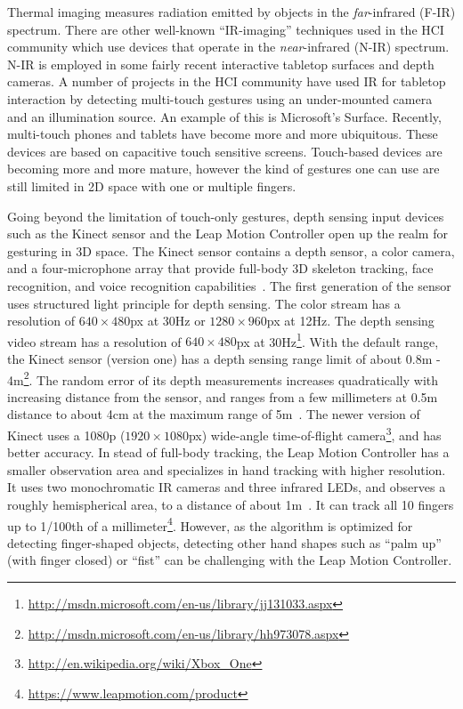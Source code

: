 Thermal imaging measures radiation emitted by objects in the
\textit{far}-infrared (F-IR) spectrum. There are other well-known ``IR-imaging''
techniques used in the HCI community which use devices that operate in the \textit{near}-infrared (N-IR) spectrum.
N-IR is employed in some fairly recent interactive tabletop surfaces and depth
cameras. A number of projects in the HCI community have used IR for tabletop
interaction by detecting multi-touch gestures using an under-mounted
camera and an illumination source. An example of this is Microsoft's 
Surface. Recently, multi-touch phones and tablets have become more and more ubiquitous. These devices
are based on capacitive touch sensitive screens. Touch-based devices are
becoming more and more mature, however the kind of gestures one can use are still
limited in 2D space with one or multiple
fingers. 

Going beyond the limitation of touch-only gestures, 
depth sensing input devices such as the Kinect sensor and the Leap Motion
Controller open up the realm for gesturing in 3D space. The Kinect sensor
contains a depth sensor, a color camera, and a four-microphone array that
provide full-body 3D skeleton tracking, face recognition, and voice
recognition capabilities~\cite{zhang12}. The first generation of the sensor
uses structured light principle for depth sensing.
The color stream has a resolution of $640\times
480$px at 30Hz or $1280\times960$px at 12Hz.  The depth sensing video stream has a resolution of $640\times 480$px at
30Hz\footnote{\url{http://msdn.microsoft.com/en-us/library/jj131033.aspx}}. 
With the default range, the Kinect sensor (version one) has a depth sensing
range limit of about 0.8m -
4m\footnote{\url{http://msdn.microsoft.com/en-us/library/hh973078.aspx}}.
The random error of its depth measurements increases quadratically with
increasing distance from the sensor, and ranges from a few millimeters at 0.5m
distance to about 4cm at the maximum range of 5m~\cite{khoshelham2011}. The newer version of Kinect
uses a 1080p ($1920\times 1080$px) wide-angle time-of-flight
camera\footnote{\url{http://en.wikipedia.org/wiki/Xbox_One}}, and has better
accuracy.
In stead of full-body tracking, the Leap Motion Controller has a
smaller observation area and specializes in hand tracking with higher
resolution.
It uses two monochromatic IR cameras and three infrared LEDs, and observes a
roughly hemispherical area, to a distance of about 1m~\cite{leapmotion14}. It
can track all 10 fingers up to 1/100th of a
millimeter\footnote{\url{https://www.leapmotion.com/product}}. However, as
the algorithm is optimized for detecting finger-shaped objects, detecting other
hand shapes such as ``palm up'' (with finger closed) or ``fist'' can be
challenging with the Leap Motion Controller.

